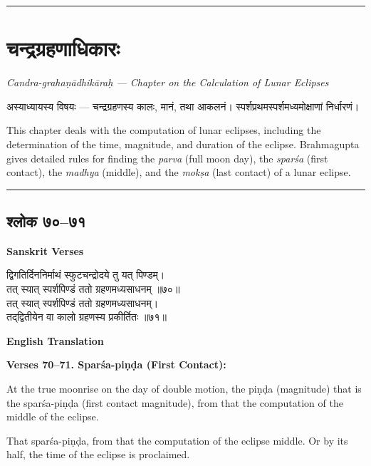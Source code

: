 \documentclass[11pt,a4paper]{article}
\newcommand{\longline}{\noindent\rule{\textwidth}{0.4pt}}
\newcommand{\dev}[1]{{\devanagarifont #1}}
\newcommand{\sectsep}{\par\vspace{0.8em}\longline\vspace{0.8em}}
\begin{document}
\sectsep

\section{\dev{चन्द्रग्रहणाधिकारः}}

\begin{center}
\textit{Candra-graha\d{n}\=adhik\=ara\d{h} --- Chapter on the Calculation of Lunar Eclipses}
\end{center}

\begin{minipage}[t]{0.48\textwidth}
\small\devanagarifont
अस्याध्यायस्य विषयः --- चन्द्रग्रहणस्य कालः, मानं, तथा आकलनं। स्पर्शप्रथमस्पर्शमध्यमोक्षाणां निर्धारणं।
\end{minipage}%
\hfill
\begin{minipage}[t]{0.48\textwidth}
\small
This chapter deals with the computation of lunar eclipses, including the determination of the time, magnitude, and duration of the eclipse. Brahmagupta gives detailed rules for finding the \textit{parva} (full moon day), the \textit{spar\'sa} (first contact), the \textit{madhya} (middle), and the \textit{mok\d{s}a} (last contact) of a lunar eclipse.
\end{minipage}

\sectsep

\subsection{\dev{श्लोक ७०--७१}}

\begin{minipage}[t]{0.48\textwidth}
\textbf{\small Sanskrit Verses}

\small\devanagarifont
द्विगतिर्दिननिर्माथं स्फुटचन्द्रोदये तु यत् पिण्डम्।\\
तत् स्यात् स्पर्शपिण्डं ततो ग्रहणमध्यसाधनम् ॥७०॥\\[0.5em]
तत् स्यात् स्पर्शपिण्डं ततो ग्रहणमध्यसाधनम्।\\
तद्‌द्वितीयेन वा कालो ग्रहणस्य प्रकीर्तितः ॥७१॥
\end{minipage}%
\hfill
\begin{minipage}[t]{0.48\textwidth}
\textbf{\small English Translation}

\textbf{Verses 70--71. Spar\'sa-pi\d{n}\d{d}a (First Contact):}

At the true moonrise on the day of double motion, the pi\d{n}\d{d}a (magnitude) that is the spar\'sa-pi\d{n}\d{d}a (first contact magnitude), from that the computation of the middle of the eclipse.

That spar\'sa-pi\d{n}\d{d}a, from that the computation of the eclipse middle. Or by its half, the time of the eclipse is proclaimed.
\end{minipage}
\end{document}
